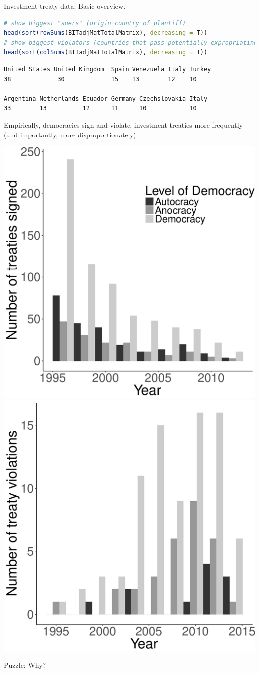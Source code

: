 \documentclass{beamer}
\begin{document}
\begin{frame}[fragile]{\large Investment treaty data: Basic overview.}
\begin{lstlisting}[language=R]
# show biggest "suers" (origin country of plantiff)
head(sort(rowSums(BITadjMatTotalMatrix), decreasing = T))
# show biggest violators (countries that pass potentially expropriating policies)
head(sort(colSums(BITadjMatTotalMatrix), decreasing = T))
\end{lstlisting}

\begin{verbatim}
United States United Kingdom  Spain Venezuela Italy Turkey 
38             30             15    13        12    10 

Argentina Netherlands Ecuador Germany Czechslovakia Italy 
33        13          12      11      10            10
\end{verbatim}
\end{frame}

\begin{frame}{\large Empirically, democracies sign and violate, investment treaties more frequently (and importantly, more disproportionately).}

\includegraphics[width=.49\linewidth]{figures/histSignRegimeType.pdf}
\includegraphics[width=.49\linewidth]{figures/histViolationRegimeType.pdf}

\begin{center}
	{\Large Puzzle: Why?}
\end{center}
\end{frame}
\end{document}
